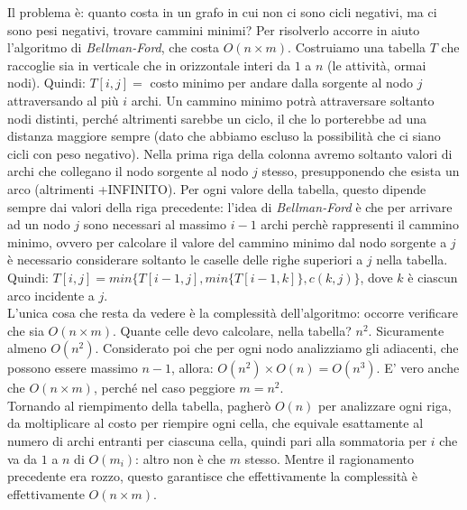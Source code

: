 Il problema è: quanto costa in un grafo in cui non ci sono cicli negativi, ma ci sono pesi negativi, trovare cammini minimi?
Per risolverlo accorre in aiuto l'algoritmo di \textit{Bellman-Ford}, che costa $O(n\times m)$.
Costruiamo una tabella $T$ che raccoglie sia in verticale che in orizzontale interi da $1$ a $n$ (le attività, ormai nodi). Quindi: $T[i,j] = $ costo minimo per andare dalla sorgente al nodo $j$ attraversando al più $i$ archi. Un cammino minimo potrà attraversare soltanto nodi distinti, perché altrimenti sarebbe un ciclo, il che lo porterebbe ad una distanza maggiore sempre (dato che abbiamo escluso la possibilità che ci siano cicli con peso negativo). Nella prima riga della colonna avremo soltanto valori di archi che collegano il nodo sorgente al nodo $j$ stesso, presupponendo che esista un arco (altrimenti +INFINITO). Per ogni valore della tabella, questo dipende sempre dai valori della riga precedente: l'idea di \textit{Bellman-Ford} è che per arrivare ad un nodo $j$ sono necessari al massimo $i-1$ archi perchè rappresenti il cammino minimo, ovvero per calcolare il valore del cammino minimo dal nodo sorgente a $j$ è necessario considerare soltanto le caselle delle righe superiori a $j$ nella tabella. Quindi: $T[i,j] = min\{T[i-1,j],min\{T[i-1,k]\},c(k,j)\}$, dove $k$ è ciascun arco incidente a $j$. \\
L'unica cosa che resta da vedere è la complessità dell'algoritmo: occorre verificare che sia $O(n\times m)$. Quante celle devo calcolare, nella tabella? $n^2$. Sicuramente almeno $O(n^2)$. Considerato poi che per ogni nodo analizziamo gli adiacenti, che possono essere massimo $n-1$, allora: $O(n^2)\times O(n) = O(n^3)$. E' vero anche che $O(n\times m)$, perché nel caso peggiore $m=n^2$. \\
Tornando al riempimento della tabella, pagherò $O(n)$ per analizzare ogni riga, da moltiplicare al costo per riempire ogni cella, che equivale esattamente al numero di archi entranti per ciascuna cella, quindi pari alla sommatoria per $i$ che va da $1$ a $n$ di $O(m_i)$: altro non è che $m$ stesso. Mentre il ragionamento precedente era rozzo, questo garantisce che effettivamente la complessità è effettivamente $O(n\times m)$.

